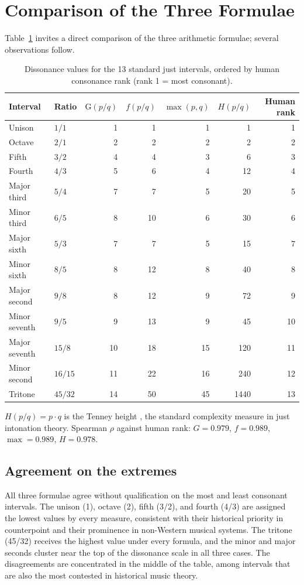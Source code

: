 \documentclass[11pt,a4paper]{article}
\newcommand{\G}{\mathrm{G}}
\begin{document}
\section{Comparison of the Three Formulae}

Table~\ref{tab:intervals} invites a direct comparison of the three arithmetic
formulae; several observations follow.

\begin{table}[h]
\centering
\caption{Dissonance values for the 13 standard just intervals, ordered by
human consonance rank \cite{krumhansl1990} (rank 1 = most consonant).}
\label{tab:intervals}
\smallskip
\begin{tabular}{llrrrrr}
\toprule
Interval & Ratio & $\G(p/q)$ & $f(p/q)$ & $\max(p,q)$ & $H(p/q)$ & Human rank \\
\midrule
Unison        & $1/1$   &  1 &  1 &  1 &     1 &  1 \\
Octave        & $2/1$   &  2 &  2 &  2 &     2 &  2 \\
Fifth         & $3/2$   &  4 &  4 &  3 &     6 &  3 \\
Fourth        & $4/3$   &  5 &  6 &  4 &    12 &  4 \\
Major third   & $5/4$   &  7 &  7 &  5 &    20 &  5 \\
Minor third   & $6/5$   &  8 & 10 &  6 &    30 &  6 \\
Major sixth   & $5/3$   &  7 &  7 &  5 &    15 &  7 \\
Minor sixth   & $8/5$   &  8 & 12 &  8 &    40 &  8 \\
Major second  & $9/8$   &  8 & 12 &  9 &    72 &  9 \\
Minor seventh & $9/5$   &  9 & 13 &  9 &    45 & 10 \\
Major seventh & $15/8$  & 10 & 18 & 15 &   120 & 11 \\
Minor second  & $16/15$ & 11 & 22 & 16 &   240 & 12 \\
Tritone       & $45/32$ & 14 & 50 & 45 &  1440 & 13 \\
\bottomrule
\end{tabular}
\smallskip

\noindent\small $H(p/q) = p \cdot q$ is the Tenney height \cite{tenney1988},
the standard complexity measure in just intonation theory.
Spearman $\rho$ against human rank: $G = 0.979$, $f = 0.989$,
$\max = 0.989$, $H = 0.978$.
\end{table}

\subsection*{Agreement on the extremes}
All three formulae agree without qualification on the most and least consonant
intervals. The unison (1), octave (2), fifth (3/2), and fourth (4/3) are
assigned the lowest values by every measure, consistent with their historical
priority in counterpoint and their prominence in non-Western musical systems.
The tritone (45/32) receives the highest value under every formula, and the
minor and major seconds cluster near the top of the dissonance scale in all
three cases. The disagreements are concentrated in the middle of the table,
among intervals that are also the most contested in historical music theory.
\end{document}
